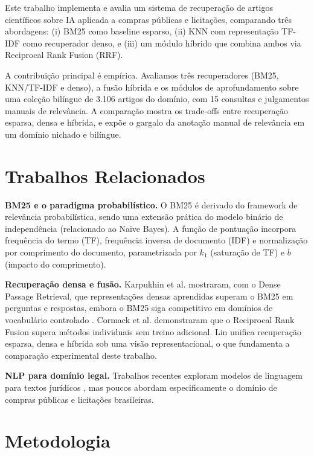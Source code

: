 \documentclass[12pt]{article}
\begin{document}
Este trabalho implementa e avalia um sistema de recuperação de artigos científicos sobre IA aplicada a compras públicas e licitações, comparando três abordagens: (i) BM25 como baseline esparso, (ii) KNN com representação TF-IDF como recuperador denso, e (iii) um módulo híbrido que combina ambos via Reciprocal Rank Fusion (RRF).

A contribuição principal é empírica. Avaliamos três recuperadores (BM25, KNN/TF-IDF e denso), a fusão híbrida e os módulos de aprofundamento sobre uma coleção bilíngue de 3.106 artigos do domínio, com 15 consultas e julgamentos manuais de relevância. A comparação mostra os trade-offs entre recuperação esparsa, densa e híbrida, e expõe o gargalo da anotação manual de relevância em um domínio nichado e bilíngue.

\section{Trabalhos Relacionados}

\textbf{BM25 e o paradigma probabilístico.} O BM25 \cite{robertson2009,manning2008} é derivado do framework de relevância probabilística, sendo uma extensão prática do modelo binário de independência (relacionado ao Naïve Bayes). A função de pontuação incorpora frequência do termo (TF), frequência inversa de documento (IDF) e normalização por comprimento do documento, parametrizada por $k_1$ (saturação de TF) e $b$ (impacto do comprimento).

\textbf{Recuperação densa e fusão.} Karpukhin et al. \cite{karpukhin2020} mostraram, com o Dense Passage Retrieval, que representações densas aprendidas superam o BM25 em perguntas e respostas, embora o BM25 siga competitivo em domínios de vocabulário controlado \cite{thakur2021}. Cormack et al. \cite{cormack2009} demonstraram que o Reciprocal Rank Fusion supera métodos individuais sem treino adicional. Lin \cite{lin2021} unifica recuperação esparsa, densa e híbrida sob uma visão representacional, o que fundamenta a comparação experimental deste trabalho.

\textbf{NLP para domínio legal.} Trabalhos recentes exploram modelos de linguagem para textos jurídicos \cite{chalkidis2020}, mas poucos abordam especificamente o domínio de compras públicas e licitações brasileiras.

\section{Metodologia}
\end{document}
